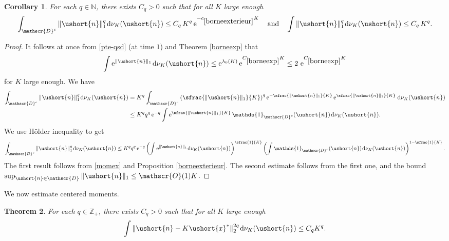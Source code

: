 \documentclass[10pt]{amsart}
\newcommand{\scaleto}[2]{#1}
\let\mathcal\mathscr
\numberwithin{equation}{section}
\theoremstyle{plain}
\newtheorem{theorem}{Theorem}[section]
\newtheorem{corollary}[theorem]{Corollary}
\theoremstyle{definition}
\newcommand{\cte}[1]{C_{\eqref{#1}}}
\newcommand{\pcte}[1]{c_{\eqref{#1}}}
\newcommand{\zentiers}{{\mathbb{Z}}}
\newcommand{\integers}{\mathbb{N}}
\newcommand{\Oun}{\mathcal{O}(1)}
\newcommand{\un}{\mathds{1}}
\newcommand{\vecn}{\ushort{n}}
\newcommand{\vecxf}{\ushort{x}^*}
\newcommand{\nuk}{\nu_{K}}\let\snuk\nuk
\newcommand{\e}{\operatorname{e}}
\newcommand{\dd}{\hspace{1pt}\mathrm{d}}
\newcommand{\norm}[1]{\|#1\|_{1}}\let\snorm\norm
\begin{document}
\begin{corollary}\label{bornepuissance}
For each $q\in\integers$, there exists $C_{q}>0$ such that for all $K$ large enough
\[
\int_{\mathcal{D}^c} \norm{\vecn}^{q}\dd \nuk(\vecn)\le C_{q}\, K^{q} \e^{-\pcte{borneexterieur} K}
\quad
\textup{and}
\quad
\int \norm{\vecn}^{q}\dd\nuk(\vecn)\le C_{q}\, K^{q}.
\]
\end{corollary}
\begin{proof}
It follows at once from \eqref{pte-qsd} (at time $1$) and Theorem \ref{borneexp} that
\begin{equation}\label{momex}
\int \e^{\|\vecn\|_{1}}\!\dd\nuk(\vecn) \le \e^{\lambda_{0}(K)}\e^{\cte{borneexp}K}
\le 2\,\e^{\cte{borneexp}K}
\end{equation}
for $K$ large enough. We have
\begin{align*}
\int_{\mathcal{D}^c} \norm{\vecn}^{q}\dd\nuk(\vecn)
&= K^q \int_{\mathcal{D}^c} \left(\sfrac{\norm{\vecn}}{K}\right)^q \e^{-\sfrac{\scaleto{\|}{5pt}\vecn\scaleto{\|}{5pt}_{1}}{K}}
\e^{\sfrac{\scaleto{\|}{5pt}\vecn\scaleto{\|}{5pt}_{1}}{K}}\dd\nuk(\vecn)\\
& \leq K^q q^q \e^{-q} \int \e^{\sfrac{\|\vecn\|_{1}}{K}} \un_{ \mathcal{D}^c}(\vecn)\dd\nuk(\vecn).
\end{align*}
We use Hölder inequality to get
\[
\int_{ \mathcal{D}^c} \norm{\vecn}^{q}\dd\nuk(\vecn)
\leq
K^q q^q \e^{-q} \left(\int \e^{\|\vecn\|_{1}} \!\dd\nuk(\vecn)\right)^{\sfrac{1}{K}}
\left(\int \un_{ \mathcal{D}^c}(\vecn)\dd\nuk(\vecn)\right)^{1-\sfrac{1}{K}}.
\]
The first result follows from \eqref{momex} and Proposition \ref{borneexterieur}.
The second estimate follows from the first one, and the bound
$\sup_{\vecn \in \mathcal{D}} \norm{\vecn} \leq \Oun K$.
\end{proof}

We now estimate centered moments.
\begin{theorem}\label{bornemom}
For each $q\in\zentiers_{+}$, there exists $C_{q}>0$ such that for all $K$ large enough
\[
\int \|\vecn-K\vecxf \|_{2}^{2\scaleto{q}{5pt}}\dd\nuk(\vecn)\le C_{q} K^{q}.
\]
\end{theorem}
\end{document}
